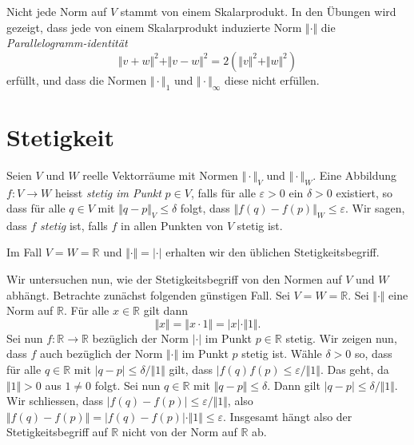 \documentclass[../main.tex]{subfiles}
\begin{document}
\begin{remark}
  Nicht jede Norm auf $V$ stammt von einem Skalarprodukt.
  In den Übungen wird gezeigt, dass jede von einem Skalarprodukt
  induzierte Norm $\Vert \cdot \Vert$ die
  \emph{Parallelogramm-identität}
  \[
    \Vert v + w \Vert^2 + \Vert v - w \Vert^2 
    = 2(\Vert v \Vert^2 + \Vert w \Vert^2)
  \]
  erfüllt, und dass die Normen $\Vert \cdot \Vert_1$ 
  und $\Vert \cdot \Vert_{\infty}$ diese nicht erfüllen.
\end{remark}

\section{Stetigkeit}\label{sec:continuity}
\begin{definition}
  Seien $V$ und $W$ reelle Vektorräume mit Normen $\Vert \cdot \Vert_V$ 
  und
  $ \Vert \cdot \Vert_W$.
  Eine Abbildung $f \colon V \to W$ heisst \emph{stetig
  im Punkt} $p \in V$, falls für alle $\varepsilon > 0$ 
  ein $\delta > 0$ existiert, so dass für alle
  $q \in V$ mit $\Vert q - p \Vert_V \leq \delta$ 
  folgt, dass
  $\Vert f(q) - f(p) \Vert_W \leq \varepsilon$.
  Wir sagen, dass $f$ \emph{stetig} ist, falls
  $f$ in allen Punkten von $V$ stetig ist.
\end{definition}

\begin{example}
  Im Fall $V = W = \mathbb{R}$ und $\Vert \cdot \Vert = \vert \cdot \vert$ 
  erhalten wir den üblichen Stetigkeitsbegriff.
\end{example}

Wir untersuchen nun,
wie der Stetigkeitsbegriff von den Normen
auf  $V$ und $W$ abhängt.
Betrachte zunächst folgenden günstigen Fall.
Sei $V = W = \mathbb{R}$. Sei $\Vert \cdot \Vert$ 
eine Norm auf $\mathbb{R}$.
Für alle $x \in \mathbb{R}$ gilt dann
\[
  \Vert x \Vert = \Vert x \cdot 1 \Vert = |x| \cdot \Vert 1 \Vert.
\]
Sei nun $f \colon \mathbb{R} \to \mathbb{R}$
bezüglich der Norm $| \cdot |$ im Punkt $p \in \mathbb{R}$ stetig.
Wir zeigen nun, dass $f$ auch bezüglich der Norm $\Vert \cdot \Vert$ 
im Punkt $p$ stetig ist.
Wähle $\delta > 0$ so, dass für alle $q \in \mathbb{R}$ 
mit $|q - p| \leq \delta/\Vert 1 \Vert$ gilt,
dass $|f(q)  f(p) \leq \varepsilon/\Vert 1 \Vert$.
Das geht, da $\Vert 1 \Vert > 0$ aus $1 \neq 0$ folgt.
Sei nun $q \in \mathbb{R}$ mit $\Vert q - p \Vert \leq \delta$.
Dann gilt $|q - p| \leq \delta / \Vert 1 \Vert$.
Wir schliessen, dass $|f(q) - f(p)| \leq \varepsilon/\Vert 1 \Vert$,
also 
$\Vert f(q) - f(p) \Vert = |f(q) - f(p)| \cdot \Vert 1 \Vert \leq \varepsilon$.
Insgesamt hängt also der Stetigkeitsbegriff auf $\mathbb{R}$ nicht von
der Norm auf $\mathbb{R}$ ab.
\end{document}
